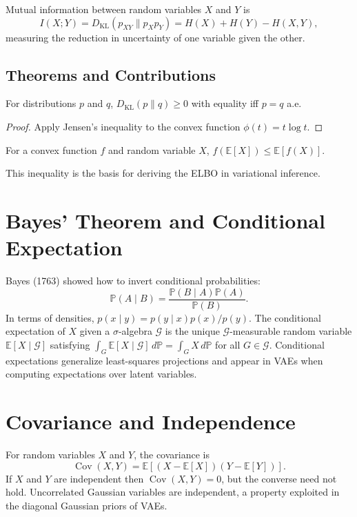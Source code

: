 Mutual information between random variables $X$ and $Y$ is
\begin{equation}
I(X;Y)=D_{\mathrm{KL}}(p_{XY}\|p_X p_Y)=H(X)+H(Y)-H(X,Y),
\end{equation}
measuring the reduction in uncertainty of one variable given the other.

\subsection{Theorems and Contributions}
\begin{theorem}
For distributions $p$ and $q$, $D_{\mathrm{KL}}(p\|q)\ge0$ with equality iff $p=q$ a.e.
\end{theorem}
\begin{proof}
Apply Jensen's inequality to the convex function $\phi(t)=t\log t$.
\end{proof}

\begin{theorem}
For a convex function $f$ and random variable $X$, $f(\mathbb{E}[X])\le\mathbb{E}[f(X)]$.
\end{theorem}
This inequality is the basis for deriving the ELBO in variational inference.

\section{Bayes' Theorem and Conditional Expectation}
Bayes (1763) showed how to invert conditional probabilities:
\begin{equation}
\mathbb{P}(A\mid B)=\frac{\mathbb{P}(B\mid A)\mathbb{P}(A)}{\mathbb{P}(B)}.
\end{equation}
In terms of densities, $p(x\mid y)=p(y\mid x)p(x)/p(y)$. The conditional expectation of $X$ given a $\sigma$-algebra $\mathcal{G}$ is the unique $\mathcal{G}$-measurable random variable $\mathbb{E}[X\mid\mathcal{G}]$ satisfying $\int_G \mathbb{E}[X\mid\mathcal{G}]\, d\mathbb{P}=\int_G X\, d\mathbb{P}$ for all $G\in\mathcal{G}$. Conditional expectations generalize least-squares projections and appear in VAEs when computing expectations over latent variables.

\section{Covariance and Independence}
For random variables $X$ and $Y$, the covariance is
\begin{equation}
\operatorname{Cov}(X,Y)=\mathbb{E}[(X-\mathbb{E}[X])(Y-\mathbb{E}[Y])].
\end{equation}
If $X$ and $Y$ are independent then $\operatorname{Cov}(X,Y)=0$, but the converse need not hold. Uncorrelated Gaussian variables are independent, a property exploited in the diagonal Gaussian priors of VAEs.

